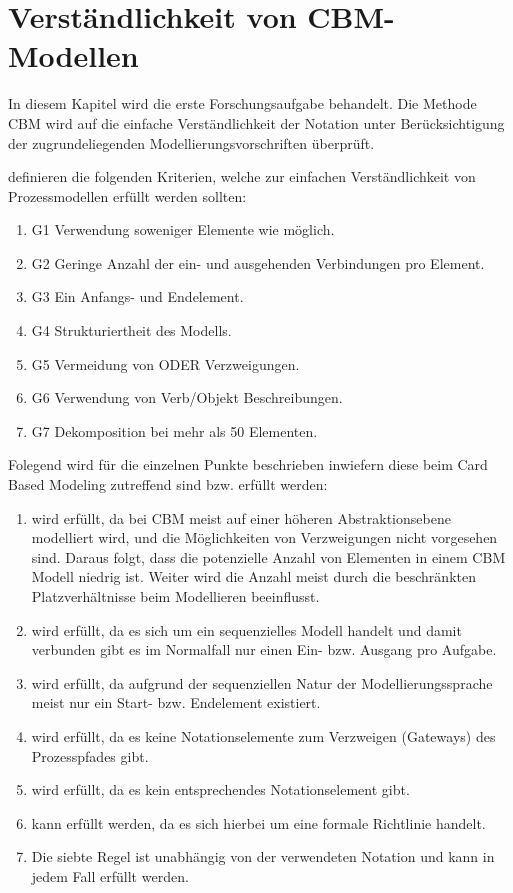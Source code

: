 %
%
% 
% 
% 

\chapter{Verständlichkeit von CBM-Modellen}
\label{cha:Empfehlungen}
In diesem Kapitel wird die erste Forschungsaufgabe behandelt. Die Methode CBM \citep{Oppl:2015:ASB:2723839.2723841} wird auf die einfache Verständlichkeit der Notation unter Berücksichtigung der zugrundeliegenden Modellierungsvorschriften überprüft.

\citeauthor{MENDLING2010127} definieren die folgenden Kriterien, welche zur einfachen Verständlichkeit von Prozessmodellen erfüllt werden sollten:
\begin{enumerate}
	\item G1 Verwendung soweniger Elemente wie möglich.
	\item G2 Geringe Anzahl der ein- und ausgehenden Verbindungen pro Element.
	\item G3 Ein Anfangs- und Endelement.
	\item G4 Strukturiertheit des Modells.
	\item G5 Vermeidung von ODER Verzweigungen.
	\item G6 Verwendung von Verb/Objekt Beschreibungen.
	\item G7 Dekomposition bei mehr als 50 Elementen.\citep{MENDLING2010127}
\end{enumerate}

Folegend wird für die einzelnen Punkte beschrieben inwiefern diese beim Card Based Modeling zutreffend sind bzw. erfüllt werden:

\begin{enumerate}
	\item wird erfüllt, da bei CBM meist auf einer höheren Abstraktionsebene modelliert wird, und die Möglichkeiten von Verzweigungen nicht vorgesehen sind. Daraus folgt, dass die potenzielle Anzahl von Elementen in einem CBM Modell niedrig ist. Weiter wird die Anzahl meist durch die beschränkten Platzverhältnisse beim Modellieren beeinflusst. 
	\item wird erfüllt, da es sich um ein sequenzielles Modell handelt und damit verbunden gibt es im Normalfall nur einen Ein- bzw. Ausgang pro Aufgabe.
	\item wird erfüllt, da aufgrund der sequenziellen Natur der Modellierungssprache meist nur ein Start- bzw. Endelement existiert.
	\item wird erfüllt, da es keine Notationselemente zum Verzweigen (Gateways) des Prozesspfades gibt. 
	\item wird erfüllt, da es kein entsprechendes Notationselement gibt. 
	\item kann erfüllt werden, da es sich hierbei um eine formale Richtlinie handelt.
	\item Die siebte Regel ist unabhängig von der verwendeten Notation und kann in jedem Fall erfüllt werden.
\end{enumerate}

